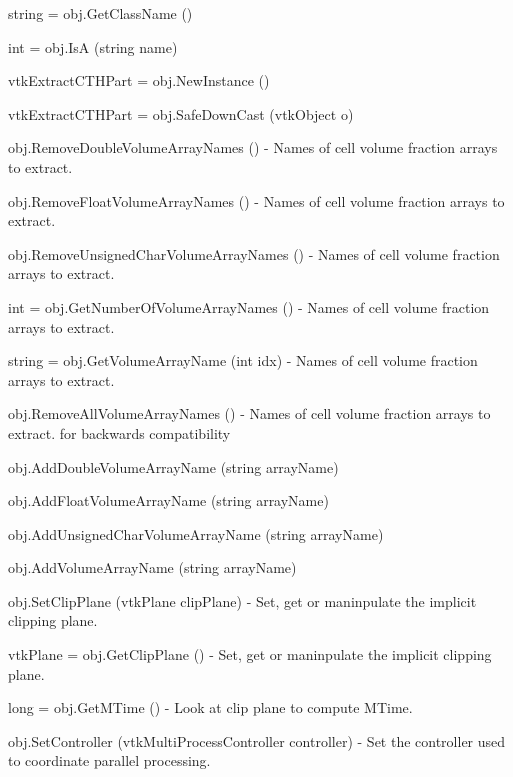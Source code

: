\begin{DoxyItemize}
\item {\ttfamily string = obj.\-Get\-Class\-Name ()}  
\item {\ttfamily int = obj.\-Is\-A (string name)}  
\item {\ttfamily vtk\-Extract\-C\-T\-H\-Part = obj.\-New\-Instance ()}  
\item {\ttfamily vtk\-Extract\-C\-T\-H\-Part = obj.\-Safe\-Down\-Cast (vtk\-Object o)}  
\item {\ttfamily obj.\-Remove\-Double\-Volume\-Array\-Names ()} -\/ Names of cell volume fraction arrays to extract.  
\item {\ttfamily obj.\-Remove\-Float\-Volume\-Array\-Names ()} -\/ Names of cell volume fraction arrays to extract.  
\item {\ttfamily obj.\-Remove\-Unsigned\-Char\-Volume\-Array\-Names ()} -\/ Names of cell volume fraction arrays to extract.  
\item {\ttfamily int = obj.\-Get\-Number\-Of\-Volume\-Array\-Names ()} -\/ Names of cell volume fraction arrays to extract.  
\item {\ttfamily string = obj.\-Get\-Volume\-Array\-Name (int idx)} -\/ Names of cell volume fraction arrays to extract.  
\item {\ttfamily obj.\-Remove\-All\-Volume\-Array\-Names ()} -\/ Names of cell volume fraction arrays to extract. for backwards compatibility  
\item {\ttfamily obj.\-Add\-Double\-Volume\-Array\-Name (string array\-Name)}  
\item {\ttfamily obj.\-Add\-Float\-Volume\-Array\-Name (string array\-Name)}  
\item {\ttfamily obj.\-Add\-Unsigned\-Char\-Volume\-Array\-Name (string array\-Name)}  
\item {\ttfamily obj.\-Add\-Volume\-Array\-Name (string array\-Name)}  
\item {\ttfamily obj.\-Set\-Clip\-Plane (vtk\-Plane clip\-Plane)} -\/ Set, get or maninpulate the implicit clipping plane.  
\item {\ttfamily vtk\-Plane = obj.\-Get\-Clip\-Plane ()} -\/ Set, get or maninpulate the implicit clipping plane.  
\item {\ttfamily long = obj.\-Get\-M\-Time ()} -\/ Look at clip plane to compute M\-Time.  
\item {\ttfamily obj.\-Set\-Controller (vtk\-Multi\-Process\-Controller controller)} -\/ Set the controller used to coordinate parallel processing.  

\end{DoxyItemize}
